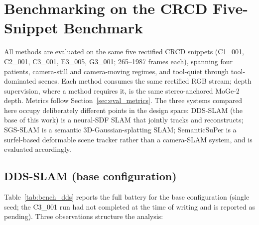 
\section{Benchmarking on the CRCD Five-Snippet Benchmark}
\label{sec:benchmarking}

All methods are evaluated on the same five rectified CRCD snippets
(C1\_001, C2\_001, C3\_001, E3\_005, G3\_001; 265--1987 frames each), spanning
four patients, camera-still and camera-moving regimes, and tool-quiet through
tool-dominated scenes. Each method consumes the same rectified RGB stream; depth
supervision, where a method requires it, is the same stereo-anchored MoGe-2 depth.
Metrics follow Section~\ref{sec:eval_metrics}. The three systems compared here
occupy deliberately different points in the design space: DDS-SLAM (the base of
this work) is a neural-SDF SLAM that jointly tracks and reconstructs; SGS-SLAM is
a semantic 3D-Gaussian-splatting SLAM; SemanticSuPer is a surfel-based deformable
scene tracker rather than a camera-SLAM system, and is evaluated accordingly.

\subsection{DDS-SLAM (base configuration)}
\label{sec:bench_dds}

Table~\ref{tab:bench_dds} reports the full battery for the base
configuration (single seed; the C3\_001 run had not completed at the time of
writing and is reported as pending). Three observations structure the analysis:

